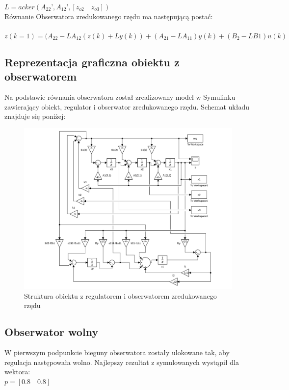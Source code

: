 \documentclass[a4paper, 11pt]{article}
\begin{document}
$L=acker(A_{22} ’,A_{12} ’, [z_{o2}\quad z_{o3} ])$\\

\noindent Równanie Obserwatora zredukowanego rzędu ma następującą postać:\\
\\

$z(k=1) = (A_{22}-LA_{12}(z(k)+Ly(k))+(A_{21}-LA_{11})y(k)+(B_2-LB1)u(k)$

\subsection{Reprezentacja graficzna obiektu z obserwatorem}
Na podstawie równania obserwatora został zrealizowany model w Symulinku zawierający obiekt, regulator i obserwator zredukowanego rzędu. Schemat układu znajduje się poniżej: 

\begin{figure}[H]
\centering
\includegraphics[scale=0.23]{obiekt_obserwator_regulator.png}
\caption{Struktura obiektu z regulatorem i obserwatorem zredukowanego rzędu}
\end{figure}

\subsection{Obserwator wolny}
W pierwszym podpunkcie bieguny obserwatora zostały ulokowane tak, aby regulacja następowała wolno. Najlepszy rezultat z symulowanych wystąpił dla wektora: \\

$p = [0.8\quad0.8]$\\
\end{document}
